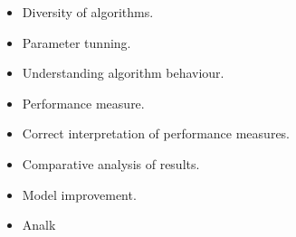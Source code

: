 \documentclass[a4paper,12pt]{report}
\begin{document}
\begin{itemize}
    \item Diversity of algorithms.
    \item Parameter tunning.
    \item Understanding algorithm behaviour.
    \item Performance measure.
    \item Correct interpretation of performance measures.
    \item Comparative analysis of results.
    \item Model improvement.
    \item Analk
\end{itemize}

	
\end{document}
